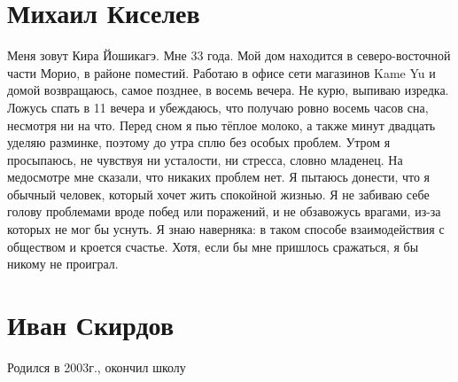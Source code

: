 \documentclass[labwork]{fefudoc}
\begin{document}
\section{Михаил Киселев}
Меня зовут Кира Йошикагэ. Мне 33 года. Мой дом находится в северо-восточной части Морио, в районе поместий. Работаю в офисе сети магазинов Kame Yu и домой возвращаюсь, самое позднее, в восемь вечера.
Не курю, выпиваю изредка. Ложусь спать в 11 вечера и убеждаюсь, что получаю ровно восемь часов сна, несмотря ни на что. Перед сном я пью тёплое молоко, а также минут двадцать уделяю разминке, поэтому до утра сплю без особых проблем.
Утром я просыпаюсь, не чувствуя ни усталости, ни стресса, словно младенец. На медосмотре мне сказали, что никаких проблем нет. Я пытаюсь донести, что я обычный человек, который хочет жить спокойной жизнью. Я не забиваю себе голову проблемами вроде побед или поражений, и не обзавожусь врагами, из-за которых не мог бы уснуть. 
Я знаю наверняка: в таком способе взаимодействия с обществом и кроется счастье. Хотя, если бы мне пришлось сражаться, я бы никому не проиграл.
\section{Иван Скирдов}
Родился в 2003г., окончил школу %
\end{document}
